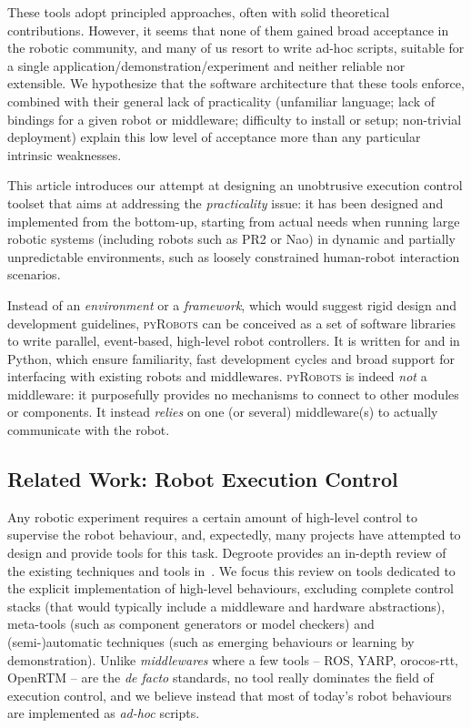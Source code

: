 \documentclass[letterpaper, 10pt, conference]{ieeeconf}      %
\newcommand{\pyRobots}{\textsc{pyRobots}}
\begin{document}
These tools adopt principled approaches, often with solid theoretical
contributions. However, it seems that none of them gained broad acceptance in
the robotic community, and many of us resort to write ad-hoc scripts, suitable
for a single application/demonstration/experiment and neither reliable nor
extensible. We hypothesize that the software architecture that these tools
enforce, combined with their general lack of practicality (unfamiliar language;
lack of bindings for a given robot or middleware; difficulty to install or
setup; non-trivial deployment) explain this low level of acceptance more than
any particular intrinsic weaknesses.

This article introduces our attempt at designing an unobtrusive execution
control toolset that aims at addressing the \emph{practicality} issue: it has
been designed and implemented from the bottom-up, starting from actual needs
when running large robotic systems (including robots such as PR2 or Nao) in
dynamic and partially unpredictable environments, such as loosely constrained
human-robot interaction scenarios.

Instead of an \emph{environment} or a \emph{framework}, which would suggest
rigid design and development guidelines, \pyRobots{} can be conceived as a set
of software libraries to write parallel, event-based, high-level robot
controllers.  It is written for and in Python, which ensure familiarity, fast
development cycles and broad support for interfacing with existing robots and
middlewares. \pyRobots{} is indeed \emph{not} a middleware: it purposefully
provides no mechanisms to connect to other modules or components. It instead
\emph{relies} on one (or several) middleware(s) to actually communicate with the
robot.

\subsection{Related Work: Robot Execution Control}

Any robotic experiment requires a certain amount of high-level control to
supervise the robot behaviour, and, expectedly, many projects have attempted to
design and provide tools for this task. Degroote provides an in-depth review of
the existing techniques and tools in~\cite{degroote2012architecture}. We focus
this review on tools dedicated to the explicit implementation of high-level
behaviours, excluding complete control stacks (that would typically include a
middleware and hardware abstractions), meta-tools (such as component generators
or model checkers) and (semi-)automatic techniques (such as emerging behaviours
or learning by demonstration). Unlike \emph{middlewares} where a few tools --
ROS, YARP, {\sc orocos}-rtt, OpenRTM -- are the \emph{de facto} standards, no tool really
dominates the field of execution control, and we believe instead that most of
today's robot behaviours are implemented as \emph{ad-hoc} scripts.
\end{document}
